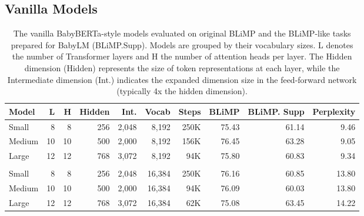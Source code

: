 
\subsection{Vanilla Models}
\label{subsec:baseline}

\begin{table}
\centering
\small
\setlength{\tabcolsep}{4pt}  %
\begin{tabular}{l | rrrrr | rrrr}
\toprule
Model  & L & H & Hidden & Int. & Vocab & Steps & BLiMP & BLiMP. Supp & Perplexity \\
\midrule
Small  & 8 & 8 & 256 & 2,048   & 8,192   & 250K      & 75.43      & 61.14       & 9.46    \\
Medium & 10 & 10 & 500 & 2,000 & 8,192  & 156K      & 76.45      & 63.28        & 9.05  \\
Large  & 12 & 12 & 768 & 3,072 & 8,192   & 94K      & 75.80      & 60.83      & 9.34 \\[2mm]
\hline \\
Small  & 8 & 8 & 256 & 2,048   & 16,384  & 250K      & 76.16      & 60.85       & 13.80    \\
Medium & 10 & 10 & 500 & 2,000  & 16,384 & 94K      & 76.09      & 60.03        & 13.80     \\
Large  & 12 & 12 & 768 & 3,072 & 16,384  & 62K      & 75.08      & 63.45      & 14.22     \\
\bottomrule
\end{tabular}
\caption{\label{tbl:baseline-size-comparison} The vanilla BabyBERTa-style models evaluated on original BLiMP and the BLiMP-like tasks prepared for BabyLM (BLiMP.Supp). Models are grouped by their vocabulary sizes. L denotes the number of Transformer layers and H the number of attention heads per layer. The Hidden dimension (Hidden) represents the size of token representations at each layer, while the Intermediate dimension (Int.) indicates the expanded dimension size in the feed-forward network (typically 4x the hidden dimension).}
\end{table}

